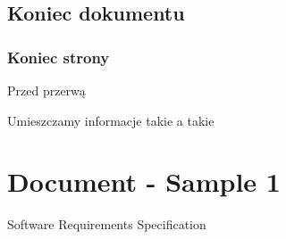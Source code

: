 \documentclass[
  a4paper,
  DIV=11,
  numbers=noendperiod,
  oneside,
  open=any]{scrreprt}
\begin{document}
\section{Koniec dokumentu}\label{koniec}

\subsection{Koniec strony}\label{koniec-strony}

Przed przerwą

\newpage{}

Umieszczamy informacje takie a takie


\chapter{Document - Sample 1}\label{document---sample-1}

Software Requirements Specification
\end{document}
